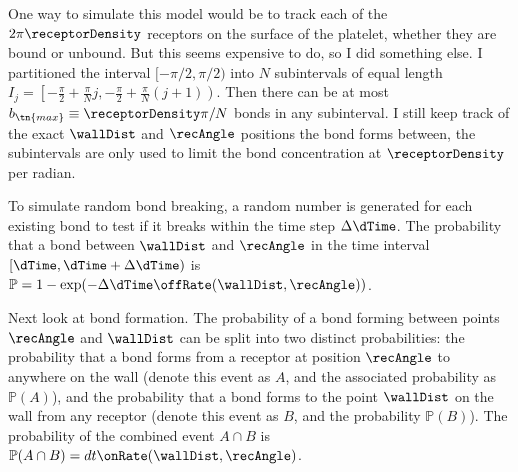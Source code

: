 One way to simulate this model would be to track each of the $2\pi
\receptorDensity$ receptors on the surface of the platelet, whether they are bound
or unbound. But this seems expensive to do, so I did something else. I
partitioned the interval $[-\pi/2, \pi/2)$ into $N$ subintervals of
equal length $I_j = \left[-\frac{\pi}{2} + \frac{\pi}{N}j,
  -\frac{\pi}{2} + \frac{\pi}{N} (j+1)\right)$. Then there can be at
most $b_\tn{max} \equiv \receptorDensity \pi/N$ bonds in any subinterval. I still
keep track of the exact $\wallDist$ and $\recAngle$ positions the bond forms
between, the subintervals are only used to limit the bond
concentration at $\receptorDensity$ per radian. 

To simulate random bond breaking, a random number is generated for
each existing bond to test if it breaks within the time step $\Delta
\dTime$. The probability that a bond between $\wallDist$ and $\recAngle$ in the time
interval $[\dTime, \dTime + \Delta \dTime)$ is $\mathbb{P} = 1 - \exp(-\Delta \dTime
\offRate(\wallDist, \recAngle))$.

Next look at bond formation. The probability of a bond forming between
points $\recAngle$ and $\wallDist$ can be split into two distinct probabilities:
the probability that a bond forms from a receptor at position $\recAngle$
to anywhere on the wall (denote this event as $A$, and the associated
probability as $\mathbb{P}(A)$), and the probability that a bond forms
to the point $\wallDist$ on the wall from any receptor (denote this event as
$B$, and the probability $\mathbb{P}(B)$). The probability of the
combined event $A \cap B$ is $\mathbb{P}(A \cap B) = dt
\onRate(\wallDist, \recAngle)$. 




